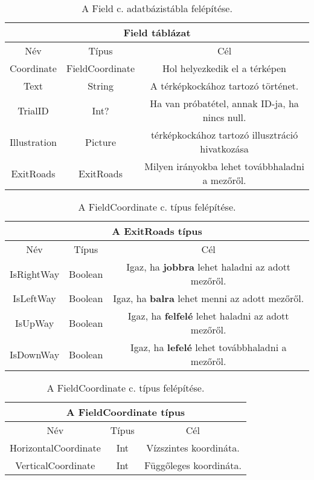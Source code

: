 \begin{table}[H]
	\centering
	\begin{tabular}{ |c|c|c| }
		\hline
		\multicolumn{3}{|c|}{Field táblázat}\\
		\hline
		Név & Típus & Cél \\
		\hline
		Coordinate  & FieldCoordinate  & Hol helyezkedik el a térképen  \\
		\hline
		Text & String & A térképkockához tartozó történet.\\
		\hline
		TrialID & Int? & Ha van próbatétel, annak ID-ja, ha nincs null.\\
		\hline
		Illustration & Picture & térképkockához tartozó illusztráció hivatkozása\\
		\hline
		ExitRoads & ExitRoads & Milyen irányokba lehet továbbhaladni a mezőről.\\
		\hline
	\end{tabular}
	\caption[Field adatbázistábla]{A Field c. adatbázistábla felépítése.}
	\label{tab:field}
\end{table}

\begin{table}[H]
	\centering
	\begin{tabular}{ |c|c|c| }
		\hline
		\multicolumn{3}{|c|}{A ExitRoads típus}\\
		\hline
		Név & Típus & Cél \\
		\hline
		IsRightWay  & Boolean  & Igaz, ha \textbf{jobbra} lehet haladni az adott mezőről.  \\
		\hline
		IsLeftWay & Boolean & Igaz, ha \textbf{balra} lehet menni az adott mezőről.\\
		\hline
		IsUpWay & Boolean & Igaz, ha \textbf{felfelé} lehet haladni az adott mezőről.\\
		\hline
		IsDownWay & Boolean & Igaz, ha \textbf{lefelé} lehet továbbhaladni a mezőről.\\
		\hline
	\end{tabular}
	\caption[FielCoordinate típus]{A FieldCoordinate c. típus felépítése.}
	\label{tab:field}
\end{table}

\begin{table}[H]
	\centering
	\begin{tabular}{ |c|c|c| }
		\hline
		\multicolumn{3}{|c|}{A FieldCoordinate típus}\\
		\hline
		Név & Típus & Cél \\
		\hline
		HorizontalCoordinate  & Int  & Vízszintes koordináta.  \\
		\hline
		VerticalCoordinate & Int &Függőleges koordináta.\\
		\hline
	\end{tabular}
	\caption[FielCoordinate típus]{A FieldCoordinate c. típus felépítése.}
	\label{tab:field}
\end{table}

